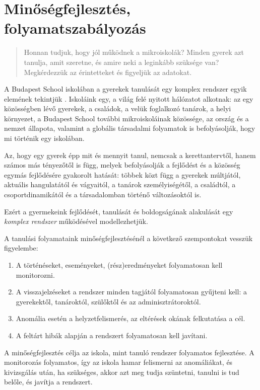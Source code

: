 \section{Minőségfejlesztés, folyamatszabályozás}
\label{sec:minosegbiztositas}
\begin{quote}
      Honnan tudjuk, hogy jól működnek a mikroiskolák? Minden gyerek azt
      tanulja,
      amit szeretne, és amire neki a leginkább szüksége van? Megkérdezzük az
      érintetteket és figyeljük az adatokat.
\end{quote}

A Budapest School iskolában a gyerekek tanulását egy komplex rendszer egyik
elemének tekintjük \citep{barabasi}. Iskoláink egy, a világ felé nyitott
hálózatot alkotnak: az egy közösségben lévő gyerekek, a családok, a velük
foglalkozó tanárok, a helyi környezet, a Budapest School további
mikroiskoláinak közössége, az ország és a nemzet állapota, valamint a globális
társadalmi folyamatok is befolyásolják, hogy mi történik egy iskolában.

Az, hogy egy gyerek épp mit és mennyit tanul, nemcsak a kerettantervtől,
hanem számos más tényezőtől is függ, melyek befolyásolják a fejlődést és a
közösség egymás fejlődésére gyakorolt hatását: többek közt függ a gyerekek
múltjától, aktuális hangulatától és vágyaitól, a tanárok személyiségétől, a
családtól, a csoportdinamikától és a társadalomban történő változásoktól
is.

Ezért a gyermekeink fejlődését, tanulását és boldogságának alakulását egy
\emph{komplex rendszer} működésével modellezhetjük.

A tanulási folyamataink minőségfejlesztésénél a következő szempontokat vesszük
figyelembe:
\begin{enumerate}
      \item  A történéseket, eseményeket, (rész)eredményeket folyamatosan kell
            monitorozni.
      \item  A visszajelzéseket a rendszer minden tagjától folyamatosan
            gyűjteni kell: a gyerekektől, tanároktól, szülőktől és az
            adminisztrátoroktól.
      \item Anomália esetén a helyzetfelismerés, az eltérések okának
            felkutatása a
            cél.
      \item A feltárt hibák alapján a rendszert folyamatosan kell javítani.
\end{enumerate}

A minőségfejlesztés célja az iskola, mint tanuló rendszer folyamatos
fejlesztése. A monitorozás folyamatos,
így az iskola hamar  felismerni az anomáliákat, és kivizsgálás után, ha szükséges,
akkor azt meg tudja szüntetni, tanulni is tud belőle, és
javítja a rendszert.

